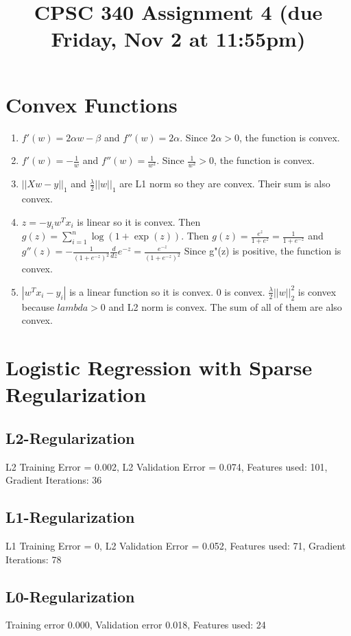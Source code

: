 \documentclass{article}
\def\enum#1{\begin{enumerate}#1\end{enumerate}}
\begin{document}
\title{CPSC 340 Assignment 4 (due Friday, Nov 2 at 11:55pm)}
\date{}
\maketitle

\vspace{-7em}

\section{Convex Functions}

\enum{
\item $f'(w) = 2\alpha w - \beta$ and $f''(w) = 2\alpha$. Since $2\alpha > 0$, the function is convex.
\item $f'(w) = -\frac{1}{w} $ and $f''(w) = \frac{1}{w^2}$. Since $\frac{1}{w^2} > 0$, the function is convex.
\item $||Xw-y||_1$ and $\frac{\lambda}{2}||w||_1$ are L1 norm so they are convex. Their sum is also convex.
\item $z = -y_iw^Tx_i$ is linear so it is convex. Then $g(z) = \sum_{i=1}^n \log(1+\exp(z))$. Then $g(z) = \frac{e^z}{1+e^z} = 
\frac{1}{1+e^{-z}}$ and $g''(z) = -\frac{1}{(1+e^{-z})^2} \frac{d}{dz}e^{-z} = \frac{e^{-z}}{(1+e^{-z})^2}$ Since
g"(z) is positive, the function is convex.
\item $|w^Tx_i-y_i|$ is a linear function so it is convex. 0 is convex. $\frac{\lambda}{2}||w||^2_2$ is convex because 
$lambda > 0$ and L2 norm is convex. The sum of all of them are also convex.
}

\section{Logistic Regression with Sparse Regularization}

\subsection{L2-Regularization}
L2 Training Error = 0.002, L2 Validation Error = 0.074, Features used: 101, Gradient Iterations: 36

\subsection{L1-Regularization}
L1 Training Error = 0, L2 Validation Error = 0.052, Features used: 71, Gradient Iterations: 78

\subsection{L0-Regularization}
Training error 0.000,
Validation error 0.018,
Features used: 24
\end{document}
